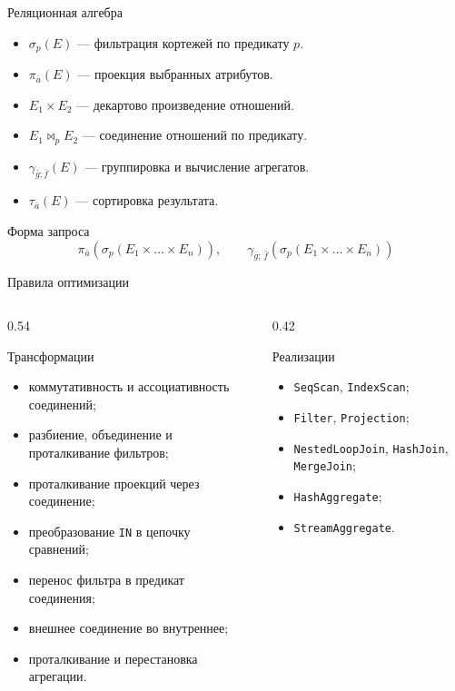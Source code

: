 \documentclass{beamer}
\newcommand{\sqlkw}[1]{\texttt{#1}}
\newcommand{\HashJoin}{\sqlkw{HashJoin}}
\newcommand{\MergeJoin}{\sqlkw{MergeJoin}}
\newcommand{\NestedLoopJoin}{\sqlkw{NestedLoopJoin}}
\newcommand{\SeqScan}{\sqlkw{SeqScan}}
\newcommand{\IndexScan}{\sqlkw{IndexScan}}
\newcommand{\Sel}[2]{\sigma_{#1}(#2)}
\newcommand{\Projection}[2]{\pi_{#1}(#2)}
\newcommand{\Agg}[3]{\gamma_{#1;\,#2}(#3)}
\begin{document}
\begin{frame}{Реляционная алгебра}
\begin{itemize}
  \item \(\sigma_p(E)\) --- фильтрация кортежей по предикату \(p\).
  \item \(\pi_{\bar a}(E)\) --- проекция выбранных атрибутов.
  \item \(E_1 \times E_2\) --- декартово произведение отношений.
  \item \(E_1 \Join_p E_2\) --- соединение отношений по предикату.
  \item \(\gamma_{\bar g;\bar f}(E)\) --- группировка и вычисление агрегатов.
  \item \(\tau_{\bar a}(E)\) --- сортировка результата.
\end{itemize}

\begin{block}{Форма запроса}
\[
  \Projection{\bar a}{\Sel{p}{E_1 \times \ldots \times E_n}},
  \qquad
  \Agg{\bar g}{\bar f}{\Sel{p}{E_1 \times \ldots \times E_n}}
\]
\end{block}
\end{frame}

\begin{frame}{Правила оптимизации}
\footnotesize
\begin{columns}[T,onlytextwidth]
\begin{column}{0.54\textwidth}
\begin{block}{Трансформации}
\begin{itemize}
  \item коммутативность и ассоциативность соединений;
  \item разбиение, объединение и проталкивание фильтров;
  \item проталкивание проекций через соединение;
  \item преобразование \sqlkw{IN} в цепочку сравнений;
  \item перенос фильтра в предикат соединения;
  \item внешнее соединение во внутреннее;
  \item проталкивание и перестановка агрегации.
\end{itemize}
\end{block}
\end{column}
\begin{column}{0.42\textwidth}
\begin{block}{Реализации}
\begin{itemize}
  \item \SeqScan, \IndexScan;
  \item \sqlkw{Filter}, \sqlkw{Projection};
  \item \NestedLoopJoin, \HashJoin, \MergeJoin;
  \item \sqlkw{HashAggregate};
  \item \sqlkw{StreamAggregate}.
\end{itemize}
\end{block}
\end{column}
\end{columns}
\end{frame}
\end{document}
